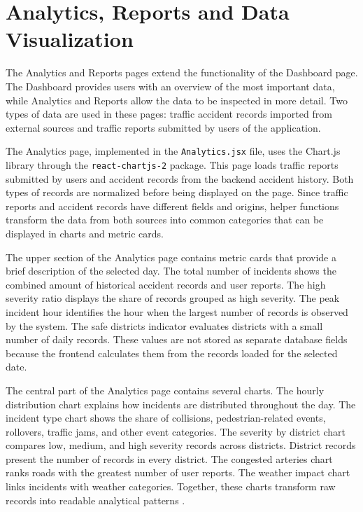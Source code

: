 ﻿\documentclass[12pt,a4paper]{report}
\begin{document}
\section{Analytics, Reports and Data Visualization}

The Analytics and Reports pages extend the functionality of the Dashboard page. The Dashboard provides users with an overview of the most important data, while Analytics and Reports allow the data to be inspected in more detail. Two types of data are used in these pages: traffic accident records imported from external sources and traffic reports submitted by users of the application.

The Analytics page, implemented in the \texttt{Analytics.jsx} file, uses the Chart.js library through the \texttt{react-chartjs-2} package. This page loads traffic reports submitted by users and accident records from the backend accident history. Both types of records are normalized before being displayed on the page. Since traffic reports and accident records have different fields and origins, helper functions transform the data from both sources into common categories that can be displayed in charts and metric cards.

The upper section of the Analytics page contains metric cards that provide a brief description of the selected day. The total number of incidents shows the combined amount of historical accident records and user reports. The high severity ratio displays the share of records grouped as high severity. The peak incident hour identifies the hour when the largest number of records is observed by the system. The safe districts indicator evaluates districts with a small number of daily records. These values are not stored as separate database fields because the frontend calculates them from the records loaded for the selected date.

The central part of the Analytics page contains several charts. The hourly distribution chart explains how incidents are distributed throughout the day. The incident type chart shows the share of collisions, pedestrian-related events, rollovers, traffic jams, and other event categories. The severity by district chart compares low, medium, and high severity records across districts. District records present the number of records in every district. The congested arteries chart ranks roads with the greatest number of user reports. The weather impact chart links incidents with weather categories. Together, these charts transform raw records into readable analytical patterns \cite{wilkinson2005}.
\end{document}

